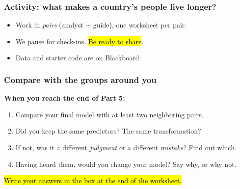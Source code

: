 \documentclass[slidestop,compress,mathserif]{beamer}
\begin{document}
\begin{frame}
\frametitle{Activity: what makes a country's people live longer?}


\vspace{0.3em}
{\small
\begin{itemize}
\item Work in \emph{pairs} (analyst + guide), one worksheet per pair.
\item We pause for check-ins. \hl{Be ready to share}.
\item Data and starter code are on Blackboard.
\end{itemize}}

\end{frame}


\begin{frame}
\frametitle{Compare with the groups around you}

\textbf{When you reach the end of Part 5:}

\vspace{0.3em}
\begin{enumerate}
\item Compare your final model with at least two neighboring pairs.
\item Did you keep the same predictors? The same transformation?
\item If not, was it a different \emph{judgment} or a different \emph{mistake}? Find out which.
\item Having heard them, would you change your model? Say why, or why not.
\end{enumerate}

\vspace{0.5em}
\hl{Write your answers in the box at the end of the worksheet.}

\end{frame}


\end{document}
